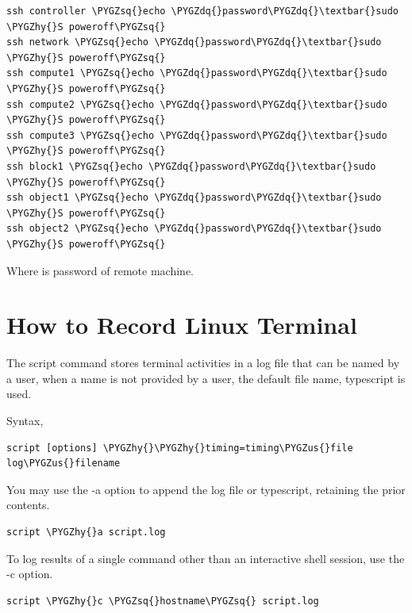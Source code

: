 \documentclass[letterpaper,10pt,english]{sphinxmanual}
\def\PYGZus{\char`\_}
\def\PYGZhy{\char`\-}
\def\PYGZsq{\char`\'}
\def\PYGZdq{\char`\"}
\begin{document}
\begin{Verbatim}[commandchars=\\\{\}]
ssh controller \PYGZsq{}echo \PYGZdq{}password\PYGZdq{}\textbar{}sudo \PYGZhy{}S poweroff\PYGZsq{}
ssh network \PYGZsq{}echo \PYGZdq{}password\PYGZdq{}\textbar{}sudo \PYGZhy{}S poweroff\PYGZsq{}
ssh compute1 \PYGZsq{}echo \PYGZdq{}password\PYGZdq{}\textbar{}sudo \PYGZhy{}S poweroff\PYGZsq{}
ssh compute2 \PYGZsq{}echo \PYGZdq{}password\PYGZdq{}\textbar{}sudo \PYGZhy{}S poweroff\PYGZsq{}
ssh compute3 \PYGZsq{}echo \PYGZdq{}password\PYGZdq{}\textbar{}sudo \PYGZhy{}S poweroff\PYGZsq{}
ssh block1 \PYGZsq{}echo \PYGZdq{}password\PYGZdq{}\textbar{}sudo \PYGZhy{}S poweroff\PYGZsq{}
ssh object1 \PYGZsq{}echo \PYGZdq{}password\PYGZdq{}\textbar{}sudo \PYGZhy{}S poweroff\PYGZsq{}
ssh object2 \PYGZsq{}echo \PYGZdq{}password\PYGZdq{}\textbar{}sudo \PYGZhy{}S poweroff\PYGZsq{}
\end{Verbatim}

Where  is password of remote machine.


\section{How to Record Linux Terminal}
\label{_source/things/screen:how-to-record-linux-terminal}\label{_source/things/screen::doc}
The script command stores terminal activities in a log file that can be named by a user, when a name is not provided by a user, the default file name, typescript is used.

Syntax,

\begin{Verbatim}[commandchars=\\\{\}]
script [options] \PYGZhy{}\PYGZhy{}timing=timing\PYGZus{}file log\PYGZus{}filename
\end{Verbatim}

You may use the -a option to append the log file or typescript, retaining the prior contents.

\begin{Verbatim}[commandchars=\\\{\}]
script \PYGZhy{}a script.log
\end{Verbatim}

To log results of a single command other than an interactive shell session, use the -c option.

\begin{Verbatim}[commandchars=\\\{\}]
script \PYGZhy{}c \PYGZsq{}hostname\PYGZsq{} script.log
\end{Verbatim}
\end{document}

